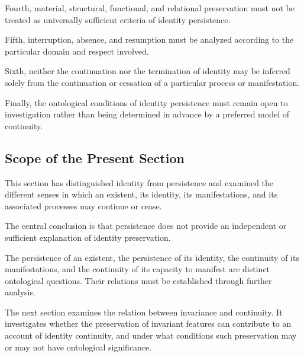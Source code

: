 Fourth, material, structural, functional, and relational
preservation must not be treated as universally sufficient
criteria of identity persistence.

Fifth, interruption, absence, and resumption must be
analyzed according to the particular domain and respect
involved.

Sixth, neither the continuation nor the termination
of identity may be inferred solely from the continuation
or cessation of a particular process or manifestation.

Finally, the ontological conditions of identity persistence
must remain open to investigation rather than being
determined in advance by a preferred model of continuity.

\subsection{Scope of the Present Section}

This section has distinguished identity from persistence
and examined the different senses in which an existent,
its identity, its manifestations, and its associated
processes may continue or cease.

The central conclusion is that persistence does not
provide an independent or sufficient explanation of
identity preservation.

The persistence of an existent, the persistence of
its identity, the continuity of its manifestations,
and the continuity of its capacity to manifest are
distinct ontological questions. Their relations must
be established through further analysis.

The next section examines the relation between invariance
and continuity. It investigates whether the preservation
of invariant features can contribute to an account
of identity continuity, and under what conditions
such preservation may or may not have ontological
significance.

